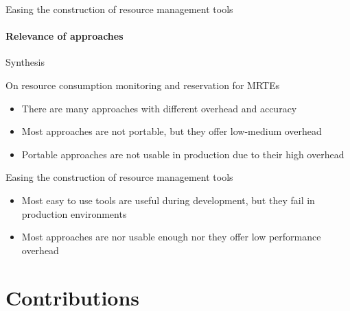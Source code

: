 \documentclass[10pt,xcolor={dvipsnames}]{beamer}
\begin{document}
	\begin{frame}{Easing the construction of resource management tools}
		\framesubtitle{Relevance of approaches}
		\centering{
			
		}
	\end{frame}
	
	
	\begin{frame}{Synthesis}
		\begin{block}{On resource consumption monitoring and reservation for MRTEs}
			\begin{footnotesize}
				\begin{itemize}
					\item There are many approaches with different overhead and accuracy
					\item Most approaches are not portable, but they offer low-medium overhead
					\item Portable approaches are not usable in production due to their high overhead
				\end{itemize}
				
			\end{footnotesize}
		\end{block}
		\vspace{1cm}
		\begin{block}{Easing the construction of resource management tools}
			\begin{footnotesize}
				\begin{itemize}
					\item Most easy to use tools are useful during development, but they fail in production environments
					\item Most approaches are nor usable enough nor they offer low performance overhead
				\end{itemize}
				
			\end{footnotesize}
		\end{block}
	\end{frame}
	
	\section[Contributions]{Contributions}
	
\end{document}
